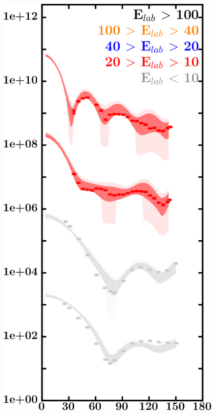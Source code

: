 \documentclass[twocolumn,secnumarabic,amssymb, nobibnotes, aps, prl,
superscriptaddress, nobalancelastpage, draft]{revtex4}
\begin{document}
\begin{figure}[!htb]
\begin{minipage}{0.4\linewidth}
        \includegraphics[width=\linewidth]{figures/ca48_neutronElastic.png}
        \label{DOM_ca48_neutron_elastic}
    \end{minipage}
    \centering
    \begin{minipage}{0.4\linewidth}
        \centering

\end{minipage}
\end{figure}
\end{document}
